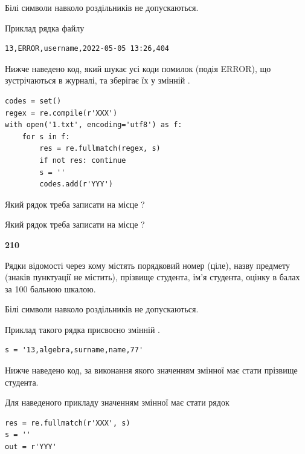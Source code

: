 Білі символи навколо роздільників не допускаються.

Приклад рядка файлу



\begin{verbatim}
13,ERROR,username,2022-05-05 13:26,404
\end{verbatim}


Нижче наведено код, який шукає усі коди помилок (подія ERROR), що зустріча\-ють\-ся в журналі, та зберігає їх у змінній .



\begin{verbatim}
codes = set()
regex = re.compile(r'XXX')
with open('1.txt', encoding='utf8') as f:
    for s in f:
        res = re.fullmatch(regex, s)
        if not res: continue
        s = ''
        codes.add(r'YYY')
\end{verbatim}





Який рядок треба записати на місце  ?\par
\vspace{5mm}


Який рядок треба записати на місце  ?\par


\newpage

{\begin {center}\textbf{ 210}\end {center}}\par
Рядки відомості через кому містять порядковий номер (ціле), назву предмету (зна\-ків пунктуації не містить), прізвище студента, ім'я студента, оцінку в балах за 100 бальною шкалою.

Білі символи навколо роздільників не допускаються.

Приклад такого рядка присвоєно змінній .



\begin{verbatim}
s = '13,algebra,surname,name,77'
\end{verbatim}


Нижче наведено код, за виконання якого значенням змінної  має стати прізвище студента.

Для наведеного прикладу значенням змінної  має стати рядок 



\begin{verbatim}
res = re.fullmatch(r'XXX', s)
s = ''
out = r'YYY'
\end{verbatim}


